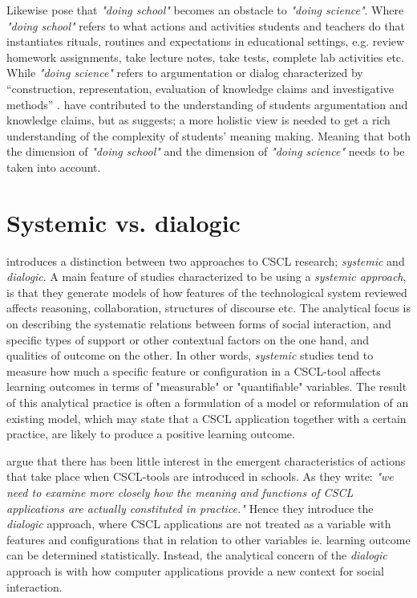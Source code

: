 Likewise \citet{jimenez2000doing} pose that \emph{"doing school"} becomes an obstacle to \emph{"doing science"}. Where \emph{"doing school"} refers to what actions and activities students and teachers do that instantiates rituals, routines and expectations in educational settings, e.g. review homework assignments, take lecture notes, take tests, complete lab activities etc. While \emph{"doing science"} refers to argumentation or dialog characterized by “construction, representation, evaluation of knowledge claims and investigative methods” \citep{jimenez2000doing}. \citeauthor{jimenez2000doing} have contributed to the understanding of students argumentation and knowledge claims, but as \citet*{furberg2008students} suggests; a more holistic view is needed to get a rich understanding of the complexity of students' meaning making. Meaning that both the dimension of \emph{"doing school"} and the dimension of \emph{"doing science"} needs to be taken into account. 

\section{Systemic vs. dialogic}
\citet{arnseth2006approaching} introduces a distinction between two approaches to CSCL research; \emph{systemic} and \emph{dialogic}. A main feature of studies characterized to be using a \emph{systemic approach}, is that they generate models of how features of the technological system reviewed affects reasoning, collaboration, structures of discourse etc. The analytical focus is on describing the systematic relations between forms of social interaction, and specific types of support or other contextual factors on the one hand, and qualities of outcome on the other. \citep{arnseth2006approaching} In other words, \emph{systemic} studies tend to measure how much a specific feature or configuration in a CSCL-tool affects learning outcomes in terms of "measurable" or "quantifiable" variables. The result of this analytical practice is often a formulation of a model or reformulation of an existing model, which may state that a CSCL application together with a certain practice, are likely to produce a positive learning outcome.

\citeauthor*{arnseth2006approaching} argue that there has been little interest in the emergent characteristics of actions that take place when CSCL-tools are introduced in schools. As they write: \emph{"we need to examine more closely how the meaning and functions of CSCL applications are actually constituted in practice."} \citep[p. 181]{arnseth2006approaching} Hence they introduce the \emph{dialogic} approach, where CSCL applications are not treated as a variable with features and configurations that in relation to other variables ie. learning outcome can be determined statistically. Instead, the analytical concern  of the \emph{dialogic} approach is with how computer applications provide a new context for social interaction.
